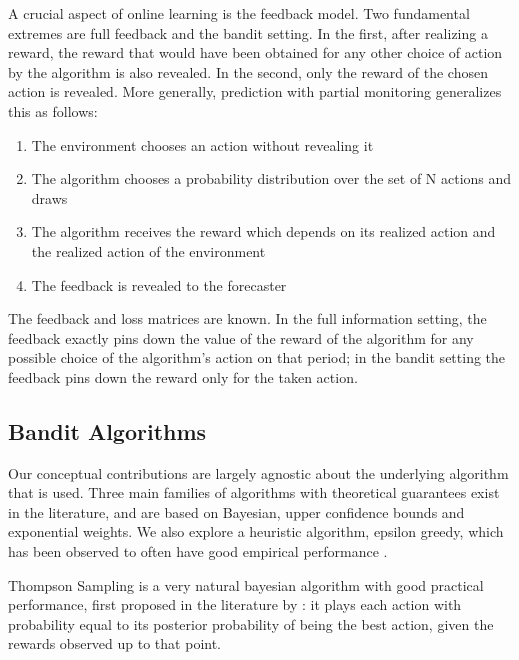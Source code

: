 A crucial aspect of online learning is the feedback model. Two fundamental extremes are full feedback and the bandit setting. In the first, after realizing a reward, the reward that would have been obtained for any other choice of action by the algorithm is also revealed. In the second, only the reward of the chosen action is revealed. %
More generally, prediction with partial monitoring \cite{cesa2006regret} generalizes this as follows:

\begin{enumerate}
\item The environment chooses an action without revealing it
\item The algorithm chooses a probability distribution over the set of N actions and draws
\item The algorithm receives the reward which depends on its realized action and the realized action of the environment
\item The feedback is revealed to the forecaster
\end{enumerate}

The feedback and loss matrices are known. In the full information setting, the feedback exactly pins down the value of the reward of the algorithm for any possible choice of the algorithm's action on that period; in the bandit setting the feedback pins down the reward only for the taken action.


\subsection{Bandit Algorithms}

Our conceptual contributions are largely agnostic about the underlying algorithm that is used.
Three main families of algorithms with theoretical guarantees exist in the literature, and are based on Bayesian, upper confidence bounds and exponential weights. We also explore a  heuristic algorithm, epsilon greedy, which has been observed to often have good empirical performance \cite{kuleshov:14}.

Thompson Sampling is a very natural bayesian algorithm with good practical performance, first proposed in the literature by \cite{thompson:33}: it plays each action with probability equal to its posterior probability of being the best action, given the rewards observed up to that point.

